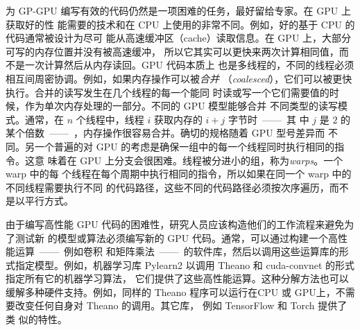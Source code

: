 为 GP-GPU 编写有效的代码仍然是一项困难的任务，最好留给专家。在 GPU 上获取好的性
能需要的技术和在 CPU 上使用的非常不同。例如，好的基于 CPU 的代码通常被设计为尽可
能从高速缓冲区（cache）读取信息。在 GPU 上，大部分可写的内存位置并没有被高速缓冲，
所以它其实可以更快来两次计算相同值，而不是一次计算然后从内存读回。GPU 代码本质上
也是多线程的，不同的线程必须相互间周密协调。例如，如果内存操作可以被\emph{合并}
（\textit{coalesced}），它们可以被更快执行。合并的读写发生在几个线程的每一个能同
时读或写一个它们需要值的时候，作为单次内存处理的一部分。不同的 GPU 模型能够合并
不同类型的读写模式。通常，在 $n$ 个线程中，线程 $i$ 获取内存的 $i + j$ 字节时~——~其
中 $j$ 是 $2$ 的某个倍数~——~，内存操作很容易合并。确切的规格随着 GPU 型号差异而
不同。另一个普遍的对 GPU 的考虑是确保一组中的每一个线程同时执行相同的指令。这意
味着在 GPU 上分支会很困难。线程被分进小的组，称为\emph{warps}。一个 warp 中的每
个线程在每个周期中执行相同的指令，所以如果在同一个 warp 中的不同线程需要执行不同
的代码路径，这些不同的代码路径必须按次序遍历，而不是以平行方式。

由于编写高性能 GPU 代码的困难性，研究人员应该构造他们的工作流程来避免为了测试新
的模型或算法必须编写新的 GPU 代码。通常，可以通过构建一个高性能运算~——~例如卷积
和矩阵乘法~——~的软件库，然后以调用这些运算库的形式指定模型。例如，机器学习库
Pylearn2 \citep{journals/corr/GoodfellowWLDMPBBB13} 以调用 Theano
\citep{bergstra-proc-scipy-2010,DBLP:journals/corr/abs-1211-5590} 和
cuda-convnet \citep{krizhevsky2010convolutional} 的形式指定所有它的机器学习算法，
它们提供了这些高性能运算。这种分解方法也可以缓解多种硬件支持。例如，同样的
Theano 程序可以运行在CPU 或 GPU上，不需要改变任何自身对 Theano 的调用。其它库，
例如 TensorFlow \citep{tensorflow} 和 Torch \citep{collobert2011torch7} 提供了类
似的特性。
